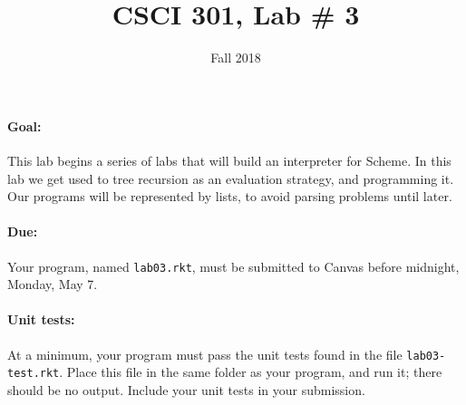 \documentclass{article}
\title{CSCI 301, Lab \# 3}
\author{Fall 2018}
\date{}
\begin{document}
\maketitle


\paragraph{Goal:} This lab begins a series of labs that will
build an interpreter for Scheme.  In this lab we get used to
tree recursion as an evaluation strategy, and programming it.
Our programs will be represented by lists, to avoid parsing problems
until later.

\paragraph{Due:} Your program, named {\tt lab03.rkt}, must be submitted to
Canvas before midnight, Monday, May 7.

\paragraph{Unit tests:}
At a minimum, your program must pass the unit tests found in the
file {\tt lab03-test.rkt}.  Place this file in the same folder
as your program, and run it;  there should be no output.  Include
your unit tests in your submission.
\end{document}
